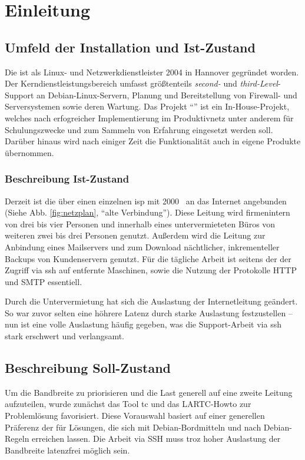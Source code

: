 \chapter{Einleitung}
\section{Umfeld der Installation und Ist-Zustand}
Die {\auftraggeber} ist als Linux- und Netzwerkdienstleister 2004 in Hannover gegründet worden. Der Kerndienstleistungsbereich umfasst größtenteils \textit{second-} und \textit{third-Level}-Support an \gls{Debian}-Linux-Servern, Planung und Bereitstellung von Firewall- und Serversystemen sowie deren Wartung.
Das Projekt "`\textit{\titel}"' ist ein In-House-Projekt, welches nach erfogreicher Implementierung im Produktivnetz unter anderem für Schulungszwecke und zum Sammeln von Erfahrung eingesetzt werden soll. Darüber hinaus wird nach einiger Zeit die Funktionalität auch in eigene Produkte übernommen.
\subsection*{Beschreibung Ist-Zustand}
Derzeit ist die {\auftraggeber} über einen einzelnen \gls{isp} mit 2000~{\kibi\bit\per\second} an das Internet angebunden (Siehe Abb. \vref{fig:netzplan}, "`alte Verbindung"').
Diese Leitung wird firmenintern von drei bis vier Personen und innerhalb eines untervermieteten Büros von weiteren zwei bis drei Personen genutzt. Außerdem wird die Leitung zur Anbindung eines Mailservers und zum Download nächtlicher, inkrementeller Backups von Kundenservern genutzt. Für die tägliche Arbeit ist seitens der {\auftraggeber} der Zugriff via \gls{ssh} auf entfernte Maschinen, sowie die Nutzung der Protokolle \gls{HTTP} und \gls{SMTP} essentiell.

Durch die Untervermietung hat sich die Auslastung der Internetleitung geändert. So war zuvor selten eine höhrere Latenz durch starke Auslastung festzustellen -- nun ist eine volle Auslastung häufig gegeben, was die Support-Arbeit via \gls{ssh} stark erschwert und verlangsamt.

\section{Beschreibung Soll-Zustand}
Um die Bandbreite zu priorisieren und die Last generell auf eine zweite Leitung aufzuteilen, wurde zunächst das Tool \gls{tc} und das LARTC-Howto \citep{LARTC} zur Problemlösung favorisiert. Diese Vorauswahl basiert auf einer generellen Präferenz der {\auftraggeber} für Lösungen, die sich mit \gls{Debian}-Bordmitteln und nach \gls{Debian}-Regeln erreichen lassen. Die Arbeit via SSH muss troz hoher Auslastung der Bandbreite latenzfrei möglich sein.
